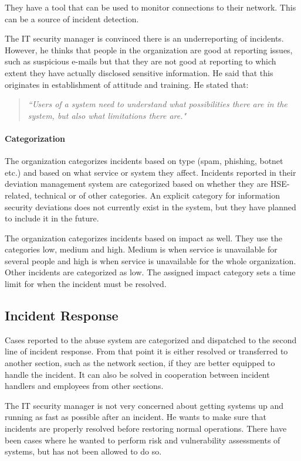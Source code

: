 They have a tool that can be used to monitor connections to their network. This can be a source of incident detection.

The IT security manager is convinced there is an underreporting of incidents. However, he thinks that people in the organization are good at reporting issues, such as suspicious e-mails but that they are not good at reporting to which extent they have actually disclosed sensitive information. He said that this originates in establishment of attitude and training. He stated that:

\begin{quote}
\textit{``Users of a system need to understand what possibilities there are in the system, but also what limitations there are."} 
\end{quote}

\paragraph{Categorization}
The organization categorizes incidents based on type (spam, phishing, botnet etc.) and based on what service or system they affect. Incidents reported in their deviation management system are categorized based on whether they are \ac{HSE}-related, technical or of other categories. An explicit category for information security deviations does not currently exist in the system, but they have planned to include it in the future.

The organization categorizes incidents based on impact as well. They use the categories low, medium and high. Medium is when service is unavailable for several people and high is when service is unavailable for the whole organization. Other incidents are categorized as low. The assigned impact category sets a time limit for when the incident must be resolved.

\subsection{Incident Response}
Cases reported to the abuse system are categorized and dispatched to the second line of incident response. %
From that point it is either resolved or transferred to another section, such as the network section, if they are better equipped to handle the incident. It can also be solved in cooperation between incident handlers and employees from other sections.

The IT security manager is not very concerned about getting systems up and running as fast as possible after an incident. He wants to make sure that incidents are properly resolved before restoring normal operations. There have been cases where he wanted to perform risk and vulnerability assessments of systems, but has not been allowed to do so.

